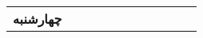 \documentclass{article}
\begin{document}
\begin{sidewaystable}[h]
\begin{center}
\begin{tabular}{|c|c|c||c|c||c|c||c|c||c|c|}
								\multirow{5}{*}{\textbf{چهارشنبه}}
				& & & & & & & & & & \\
				\cline{2-11}
				& & & & & & & & & & \\
				\cline{2-11}				
				& & & & & & & & & & \\
				\cline{2-11}
				& & & & & & & & & & \\
				\cline{2-11}				
				& & & & & & & & & & \\
				\hline
				
			\end{tabular}
		\end{center}
	\end{sidewaystable}
\end{document}
